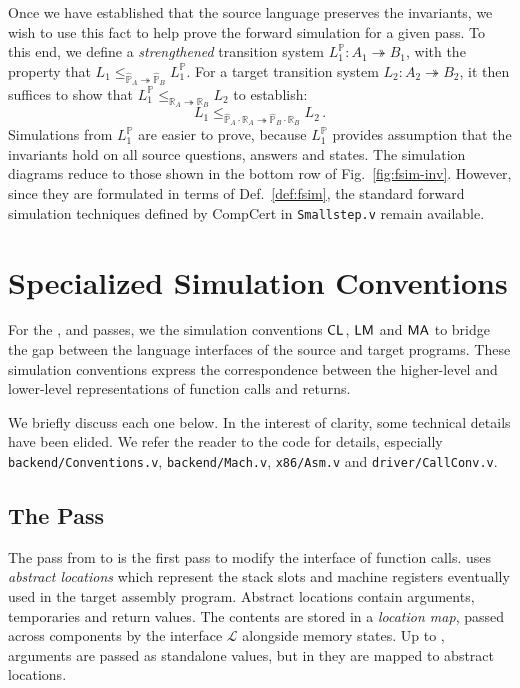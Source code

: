 \documentclass[sigplan,screen]{acmart}
\newenvironment{optional}{}{}
\begin{document}
\begin{optional}
Once we have established that
the source language preserves the invariants,
we wish to use this fact to help prove the forward simulation
for a given pass.
To this end,
we define a \emph{strengthened} transition system
$L_1^\mathbb{P} : A_1 \twoheadrightarrow B_1$,
with the property that
$
   L_1 \le_{\hat{\mathbb{P}}_A \twoheadrightarrow \hat{\mathbb{P}}_B}
   L_1^\mathbb{P}
$.
For a target transition system $L_2 : A_2 \twoheadrightarrow B_2$,
it then suffices to show that
$
  L_1^\mathbb{P}
  \le_{\mathbb{R}_A \twoheadrightarrow \mathbb{R}_B}
  L_2
$
to establish:
\[
  L_1
  \le_{\hat{\mathbb{P}}_A \cdot \mathbb{R}_A \twoheadrightarrow
       \hat{\mathbb{P}}_B \cdot \mathbb{R}_B}
  L_2 \,.
\]
Simulations from $L_1^\mathbb{P}$
are easier to prove,
because $L_1^\mathbb{P}$
provides assumption that the invariants hold
on all source questions, answers and states.
The simulation diagrams
reduce to those shown in the bottom row of
Fig.~\ref{fig:fsim-inv}.
However, since they are formulated in terms of
Def.~\ref{def:fsim},
the standard forward simulation techniques
defined by CompCert
in \texttt{Smallstep.v}
remain available.



\section{Specialized Simulation Conventions} \label{sec:backend} %

For the ,  and  passes,
we the simulation conventions ${  \mathsf{CL}  }$, ${  \mathsf{LM}  }$ and ${  \mathsf{MA}  }$
to bridge the gap between
the language interfaces of the source and target programs.
These simulation conventions
express the correspondence between
the higher-level and lower-level representations
of function calls and returns.

We briefly discuss each one below.
In the interest of clarity,
some technical details have been elided.
We refer the reader to the code for details,
especially
\texttt{backend/Conventions.v},
\texttt{backend/Mach.v},
\texttt{x86/Asm.v} and
\texttt{driver/CallConv.v}.

\subsection{The  Pass} \label{sec:alloc} %

The  pass from  to 
is the first pass to modify the interface of function calls.
 uses \emph{abstract locations}
which represent the stack slots and machine registers
eventually used in the target assembly program.
Abstract locations contain arguments, temporaries and return values.
The contents are stored in a \emph{location map},
passed across components by the interface $\mathcal{L}$
alongside memory states.
Up to ,
arguments are passed as standalone values,
but in 
they are mapped to abstract locations.


\end{optional}
\end{document}
